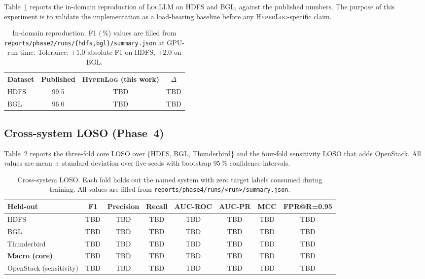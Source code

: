 \documentclass[journal, twoside]{IEEEtran}
\newcommand{\hylog}{\textsc{HyperLog}}
\newcommand{\loso}{\textsc{LOSO}}
\begin{document}
Table~\ref{tab:repro} reports the in-domain reproduction of
\textsc{LogLLM} on HDFS and BGL, against the published numbers. The
purpose of this experiment is to validate the implementation as a
load-bearing baseline before any \hylog{}-specific claim.

\begin{table}[t]
\centering
\caption{In-domain reproduction. F1 (\,\%) values are filled from
\texttt{reports/phase2/runs/\{hdfs,bgl\}/summary.json} at GPU-run
time. Tolerance: $\pm 1.0$ absolute F1 on HDFS, $\pm 2.0$ on BGL.}
\label{tab:repro}
\begin{tabular}{lccc}
\toprule
Dataset & Published & \textbf{\hylog{} (this work)} & $\Delta$ \\
\midrule
HDFS    & 99.5     & TBD                            & TBD \\
BGL     & 96.0     & TBD                            & TBD \\
\bottomrule
\end{tabular}
\end{table}

\subsection{Cross-system \loso{} (Phase~4)}\label{sec:results:loso}

Table~\ref{tab:loso} reports the three-fold core \loso{} over
\{HDFS, BGL, Thunderbird\} and the four-fold sensitivity \loso{} that
adds OpenStack. All values are mean $\pm$ standard deviation over
five seeds with bootstrap 95\,\% confidence intervals.

\begin{table}[t]
\centering
\caption{Cross-system \loso{}. Each fold holds out the named system
with zero target labels consumed during training. All values are
filled from \texttt{reports/phase4/runs/<run>/summary.json}.}
\label{tab:loso}
\begin{tabular}{lccccccc}
\toprule
Held-out & F1 & Precision & Recall & AUC-ROC & AUC-PR & MCC & FPR@R=0.95 \\
\midrule
HDFS         & TBD & TBD & TBD & TBD & TBD & TBD & TBD \\
BGL          & TBD & TBD & TBD & TBD & TBD & TBD & TBD \\
Thunderbird  & TBD & TBD & TBD & TBD & TBD & TBD & TBD \\
\textbf{Macro (core)} & TBD & TBD & TBD & TBD & TBD & TBD & TBD \\
\midrule
OpenStack (sensitivity) & TBD & TBD & TBD & TBD & TBD & TBD & TBD \\
\bottomrule
\end{tabular}
\end{table}
\end{document}
